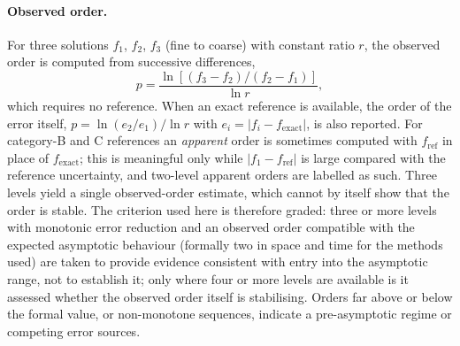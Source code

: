 \paragraph{Observed order.}
For three solutions $f_1$, $f_2$, $f_3$ (fine to coarse) with constant ratio $r$, the observed order is computed from successive differences,
\begin{equation}
	p = \frac{\ln\left[(f_3 - f_2)/(f_2 - f_1)\right]}{\ln r},
	\label{eq:observed_order}
\end{equation}
which requires no reference.
When an exact reference is available, the order of the error itself, $p = \ln(e_2/e_1)/\ln r$ with $e_i = |f_i - f_\mathrm{exact}|$, is also reported.
For category-B and C references an \emph{apparent} order is sometimes computed with $f_\mathrm{ref}$ in place of $f_\mathrm{exact}$; this is meaningful only while $|f_1 - f_\mathrm{ref}|$ is large compared with the reference uncertainty, and two-level apparent orders are labelled as such.
Three levels yield a single observed-order estimate, which cannot by itself show that the order is stable.
The criterion used here is therefore graded: three or more levels with monotonic error reduction and an observed order compatible with the expected asymptotic behaviour (formally two in space and time for the methods used) are taken to provide evidence consistent with entry into the asymptotic range, not to establish it; only where four or more levels are available is it assessed whether the observed order itself is stabilising.
Orders far above or below the formal value, or non-monotone sequences, indicate a pre-asymptotic regime or competing error sources.

